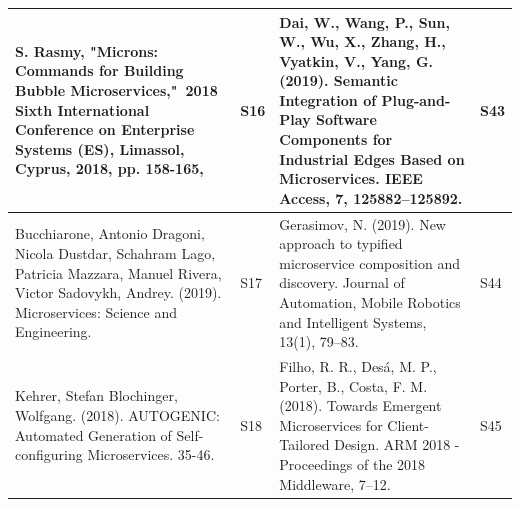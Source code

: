 \documentclass{article}
\begin{document}
\begin{appendices}
\begin{table}
\begin{center}
\begin{tabular}{ | m{20em} | m{1cm}| m{20em} | m{1cm} | }
\hline
\textcolor[rgb]{0.2,0.2,0.2}{S. Rasmy, "Microns: Commands for Building Bubble Microservices,"~}\textcolor[rgb]{0.2,0.2,0.2}{2018 Sixth International Conference on Enterprise Systems (ES)}\textcolor[rgb]{0.2,0.2,0.2}{, Limassol, Cyprus, 2018, pp. 158-165,}                                                                                           & S16            & Dai, W., Wang, P., Sun, W., Wu, X., Zhang, H., Vyatkin, V.,  Yang, G. (2019). Semantic Integration of Plug-and-Play Software Components for Industrial Edges Based on Microservices. IEEE Access, 7, 125882–125892.                                                                                                                                                                                                            & S43             \\ 
\hline
Bucchiarone, Antonio  Dragoni, Nicola  Dustdar, Schahram  Lago, Patricia  Mazzara, Manuel  Rivera, Victor  Sadovykh, Andrey. (2019). Microservices: Science and Engineering.~                                                                                                                                                                             & S17            & Gerasimov, N. (2019). New approach to typified microservice composition and discovery. Journal of Automation, Mobile Robotics and Intelligent Systems, 13(1), 79–83.                                                                                                                                                                                                                                                           & S44             \\ 
\hline
Kehrer, Stefan  Blochinger, Wolfgang. (2018). AUTOGENIC: Automated Generation of Self-configuring Microservices. 35-46.                                                                                                                                                                                                                                   & S18            & Filho, R. R., Desá, M. P., Porter, B.,  Costa, F. M. (2018). Towards Emergent Microservices for Client-Tailored Design. ARM 2018 - Proceedings of the 2018 Middleware, 7–12.                                                                                                                                                                                                                                                   & S45             \\ 
\hline

\end{tabular}
\end{center}
\end{table}
\end{appendices}
\end{document}
